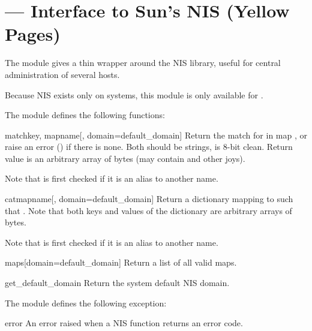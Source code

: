 \section{ ---
         Interface to Sun's NIS (Yellow Pages)}


The  module gives a thin wrapper around the NIS library, useful
for central administration of several hosts.

Because NIS exists only on \UNIX{} systems, this module is
only available for \UNIX.

The  module defines the following functions:

\begin{funcdesc}{match}{key, mapname[, domain=default_domain]}
Return the match for  in map , or raise an
error () if there is none.
Both should be strings,  is 8-bit clean.
Return value is an arbitrary array of bytes (may contain 
and other joys).

Note that  is first checked if it is an alias to another
name.

\end{funcdesc}

\begin{funcdesc}{cat}{mapname[, domain=default_domain]}
Return a dictionary mapping  to  such that
.
Note that both keys and values of the dictionary are arbitrary
arrays of bytes.

Note that  is first checked if it is an alias to another
name.

\end{funcdesc}

 \begin{funcdesc}{maps}{[domain=default_domain]}
Return a list of all valid maps.

\end{funcdesc}

 \begin{funcdesc}{get_default_domain}{}
Return the system default NIS domain. 
\end{funcdesc}

The  module defines the following exception:

\begin{excdesc}{error}
An error raised when a NIS function returns an error code.
\end{excdesc}
